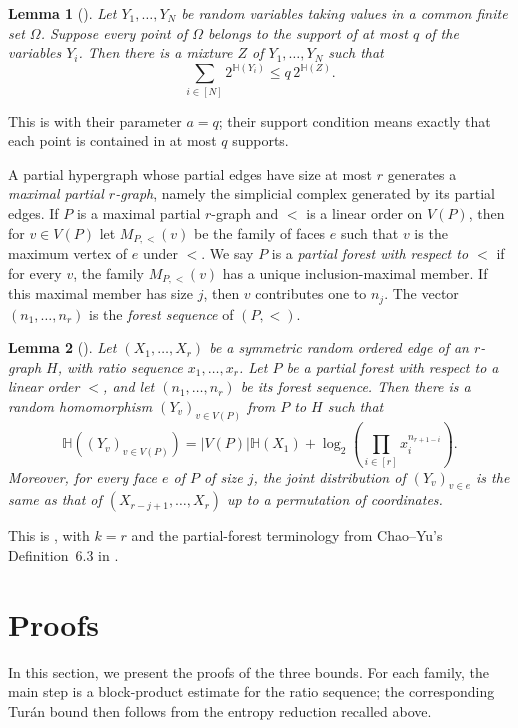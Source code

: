 \documentclass[10pt,a4paper]{article}
\theoremstyle{plain}
\newtheorem{lemma}[lemma]{Lemma}
\theoremstyle{definition}
\theoremstyle{plain}
\newcommand{\HH}{\mathbb H}
\begin{document}
\begin{lemma}[{\cite[Lemma~3.9]{CY24}}]\label{lem:mixture}
Let $Y_1,\ldots,Y_N$ be random variables taking values in a common finite set $\Omega$.  Suppose every point of $\Omega$ belongs to the support of at most $q$ of the variables $Y_i$.  Then there is a \emph{mixture} $Z$ of $Y_1,\ldots,Y_N$ such that
\[
        \sum_{i\in [N]}2^{\HH(Y_i)}\le q\,2^{\HH(Z)}.
\]
\end{lemma}
This is \cite[Lemma~3.9]{CY24} with their parameter $a=q$; their support condition means exactly that each point is contained in at most $q$ supports.

A partial hypergraph whose partial edges have size at most $r$ generates a \emph{maximal partial $r$-graph}, namely the simplicial complex generated by its partial edges.  If $P$ is a maximal partial $r$-graph and $<$ is a linear order on $V(P)$, then for $v\in V(P)$ let $M_{P,<}(v)$ be the family of faces $e$ such that $v$ is the maximum vertex of $e$ under $<$.  We say $P$ is a \emph{partial forest with respect to $<$} if for every $v$, the family $M_{P,<}(v)$ has a unique inclusion-maximal member.  If this maximal member has size $j$, then $v$ contributes one to $n_j$.  The vector $(n_1,\ldots,n_r)$ is the \emph{forest sequence} of $(P,<)$.

\begin{lemma}[{\cite[Lemma~6.5]{CY24}}]\label{lem:forest-sampling}
Let $(X_1,\ldots,X_r)$ be a symmetric random ordered edge of an $r$-graph $H$, with ratio sequence $x_1,\ldots,x_r$.  Let $P$ be a partial forest with respect to a linear order $<$, and let $(n_1,\ldots,n_r)$ be its forest sequence.  Then there is a random homomorphism $(Y_v)_{v\in V(P)}$ from $P$ to $H$ such that
\[
        \HH((Y_v)_{v\in V(P)})
        =|V(P)|\HH(X_1)+\log_2\left(\prod_{i\in [r]} x_i^{n_{r+1-i}}\right).
\]
Moreover, for every face $e$ of $P$ of size $j$, the joint distribution of $(Y_v)_{v\in e}$ is the same as that of $(X_{r-j+1},\ldots,X_r)$ up to a permutation of coordinates.
\end{lemma}
This is \cite[Lemma~6.5]{CY24}, with $k=r$ and the partial-forest terminology from Chao--Yu's Definition~6.3 in \cite{CY24}.

\section{Proofs}\label{SEC:Proof}\label{sec:proofs}

In this section, we present the proofs of the three bounds.  For each  family, the main step is a block-product estimate for the ratio sequence; the corresponding Tur\'an bound then follows from the entropy reduction recalled above.
\end{document}
